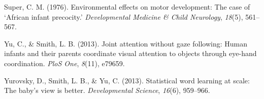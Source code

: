 \documentclass[10pt, letterpaper]{article}
\newenvironment{CSLReferences}%
  {}%
  {\par}
\begin{document}
\begin{CSLReferences}{1}{0}
\leavevmode\hypertarget{ref-super1976environmental}{}%
Super, C. M. (1976). Environmental effects on motor development: The
case of {`{A}frican infant precocity.'} \emph{Developmental Medicine \&
Child Neurology}, \emph{18}(5), 561--567.

\leavevmode\hypertarget{ref-yu2013joint}{}%
Yu, C., \& Smith, L. B. (2013). Joint attention without gaze following:
Human infants and their parents coordinate visual attention to objects
through eye-hand coordination. \emph{PloS One}, \emph{8}(11), e79659.

\leavevmode\hypertarget{ref-yurovsky2013statistical}{}%
Yurovsky, D., Smith, L. B., \& Yu, C. (2013). Statistical word learning
at scale: The baby's view is better. \emph{Developmental Science},
\emph{16}(6), 959--966.

\end{CSLReferences}


\end{document}
